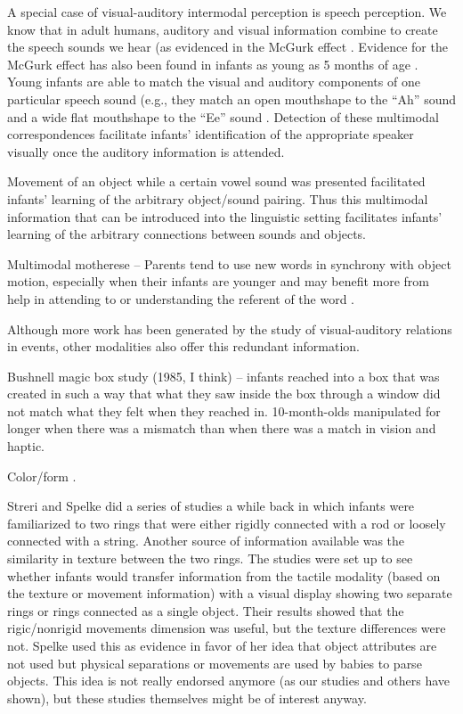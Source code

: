 A special case of visual-auditory intermodal perception is speech
perception.  We know that in adult humans, auditory and visual
information combine to create the speech sounds we hear (as evidenced
in the McGurk effect \cite{mcgurk76hearing}.  Evidence for the
McGurk effect has also been found in infants as young as 5 months of
age \cite{rosenblum97mcgurk}.  Young infants are able
to match the visual and auditory components of one particular speech
sound (e.g., they match an open mouthshape to the ``Ah'' sound and a
wide flat mouthshape to the ``Ee'' sound \cite{kuhl82bimodal}.
Detection of these multimodal correspondences facilitate infants'
identification of the appropriate speaker visually once the auditory
information is attended.

Movement of an object while a certain vowel sound was presented
facilitated infants' learning of the arbitrary object/sound pairing.
Thus this multimodal information that can be introduced into the
linguistic setting facilitates infants' learning of the arbitrary
connections between sounds and objects.

Multimodal motherese -- Parents tend to use new words in synchrony
with object motion, especially when their infants are younger and may
benefit more from help in attending to or understanding the referent
of the word \cite{gogate00study}.



Although more work has been generated by the study of visual-auditory
relations in events, other modalities also offer this redundant
information.

Bushnell magic box study (1985, I think) -- infants reached into a box
that was created in such a way that what they saw inside the box
through a window did not match what they felt when they reached in.
10-month-olds manipulated for longer when there was a mismatch than
when there was a match in vision and haptic.

Color/form \cite{bushnell85recognition}.



Streri and Spelke did a series of studies a while back in which
infants were familiarized to two rings that were either rigidly
connected with a rod or loosely connected with a string.  Another
source of information available was the similarity in texture between
the two rings.  The studies were set up to see whether infants would
transfer information from the tactile modality (based on the texture
or movement information) with a visual display showing two separate
rings or rings connected as a single object.  Their results showed
that the rigic/nonrigid movements dimension was useful, but the
texture differences were not. Spelke used this as evidence in favor of
her idea that object attributes are not used but physical separations
or movements are used by babies to parse objects.  This idea is not
really endorsed anymore (as our studies and others have shown), but
these studies themselves might be of interest anyway.



